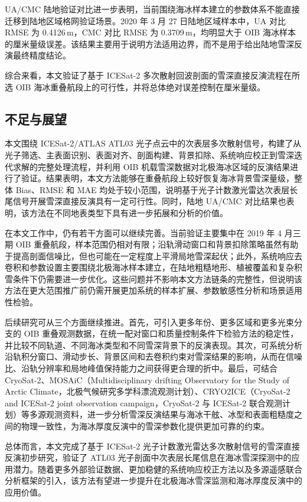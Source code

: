 UA/CMC 陆地验证对比进一步表明，当前围绕海冰样本建立的参数体系不能直接迁移到陆地区域格网验证场景。2020 年 3 月 27 日陆地区域样本中，UA 对比 RMSE 为 0.4126\,m，CMC 对比 RMSE 为 0.3709\,m，均明显大于 OIB 海冰样本的厘米量级误差。该结果主要用于说明方法适用边界，而不是用于给出陆地雪深反演最终精度结论。

综合来看，本文验证了基于 ICESat-2 多次散射回波剖面的雪深直接反演流程在所选 OIB 海冰重叠航段上的可行性，并将总体绝对误差控制在厘米量级。

\subsection{不足与展望}

本文围绕 ICESat-2/ATLAS ATL03 光子点云中的次表层多次散射信号，构建了从光子筛选、主表面识别、表面对齐、剖面构建、背景扣除、系统响应校正到雪深迭代求解的完整处理流程，并利用 OIB 机载雪深数据对北极海冰区域的反演结果进行了验证。结果表明，本文方法能够在重叠航段上较好恢复海冰背景雪深量级，整体 Bias、RMSE 和 MAE 均处于较小范围，说明基于光子计数激光雷达次表层长尾信号开展雪深直接反演具有一定可行性。同时，陆地 UA/CMC 对比结果也表明，该方法在不同地表类型下具有进一步拓展和分析的价值。

在本文工作中，仍有若干方面可以继续完善。当前验证主要集中在 2019 年 4 月三期 OIB 重叠航段，样本范围仍相对有限；沿轨滑动窗口和背景扣除策略虽然有助于提高剖面信噪比，但也可能在一定程度上平滑局地雪深起伏；此外，系统响应去卷积和参数设置主要围绕北极海冰样本建立，在陆地粗糙地形、植被覆盖和复杂积雪条件下仍需要进一步优化。这些问题并不影响本文方法链条的完整性，但说明该方法在更大范围推广前仍需开展更加系统的样本扩展、参数敏感性分析和场景适用性检验。

后续研究可从三个方面继续推进。首先，可引入更多年份、更多区域和更多光束分支的 OIB 重叠观测数据，在统一配对窗口和质量控制条件下检验方法的稳定性，并比较不同轨道、不同海冰类型和不同雪深背景下的反演表现。其次，可系统分析沿轨积分窗口、滑动步长、背景区间和去卷积约束对雪深结果的影响，从而在信噪比、沿轨分辨率和局地峰值保持能力之间获得更合理的折中。最后，可结合 CryoSat-2、MOSAiC（Multidisciplinary drifting Observatory for the Study of Arctic Climate，北极气候研究多学科漂流观测计划）、CRYO2ICE（CryoSat-2 and ICESat-2 joint observation campaign，CryoSat-2 与 ICESat-2 联合观测计划）等多源观测资料，进一步分析雪深反演结果与海冰干舷、冰型和表面粗糙度之间的物理一致性，为海冰厚度反演中的雪深参数化提供更加可靠的约束。

总体而言，本文完成了基于 ICESat-2 光子计数激光雷达多次散射信号的雪深直接反演初步研究，验证了 ATL03 光子剖面中次表层长尾信息在海冰雪深探测中的应用潜力。随着更多外部验证数据、更加稳健的系统响应校正方法以及多源遥感联合分析框架的引入，该方法有望进一步提升在北极海冰雪深监测和海冰厚度反演中的应用价值。
